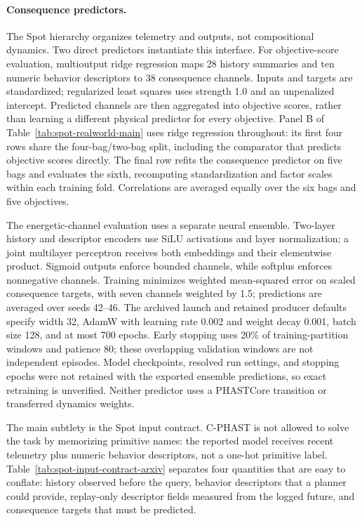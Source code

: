 \paragraph{Consequence predictors.}
\label{app:spot-models}
The Spot hierarchy organizes telemetry and outputs, not compositional dynamics.
Two direct predictors instantiate this interface. For objective-score evaluation,
multioutput ridge regression maps 28 history summaries and ten numeric behavior
descriptors to 38 consequence channels. Inputs and targets are standardized;
regularized least squares uses strength 1.0 and an unpenalized intercept.
Predicted channels are then aggregated into objective scores, rather than
learning a different physical predictor for every objective.
Panel B of Table~\ref{tab:spot-realworld-main} uses ridge regression throughout:
its first four rows share the four-bag/two-bag split, including the comparator
that predicts objective scores directly. The final row refits the consequence
predictor on five bags and evaluates the sixth, recomputing standardization
and factor scales within each training fold. Correlations are averaged equally
over the six bags and five objectives.

The energetic-channel evaluation uses a separate neural ensemble. Two-layer
history and descriptor encoders use SiLU activations and layer normalization;
a joint multilayer perceptron receives both embeddings and their elementwise
product. Sigmoid outputs enforce bounded channels, while softplus enforces
nonnegative channels. Training minimizes weighted mean-squared error on scaled
consequence targets, with seven channels weighted by 1.5; predictions are
averaged over seeds 42--46. The archived launch and retained producer defaults
specify width 32, AdamW with
learning rate 0.002 and weight decay 0.001, batch size 128, and at most 700
epochs. Early stopping uses 20\% of training-partition windows and patience 80;
these overlapping validation windows are not independent episodes. Model
checkpoints, resolved run settings, and stopping epochs were not retained
with the exported ensemble predictions, so exact retraining is unverified.
Neither predictor uses a PHASTCore transition or transferred dynamics weights.

The main subtlety is the Spot input contract.
C-PHAST is not allowed to solve the task by memorizing primitive names: the reported model receives recent telemetry plus numeric behavior descriptors, not a one-hot primitive label.
Table~\ref{tab:spot-input-contract-arxiv} separates four quantities that are easy to conflate: history observed before the query, behavior descriptors that a planner could provide, replay-only descriptor fields measured from the logged future, and consequence targets that must be predicted.

